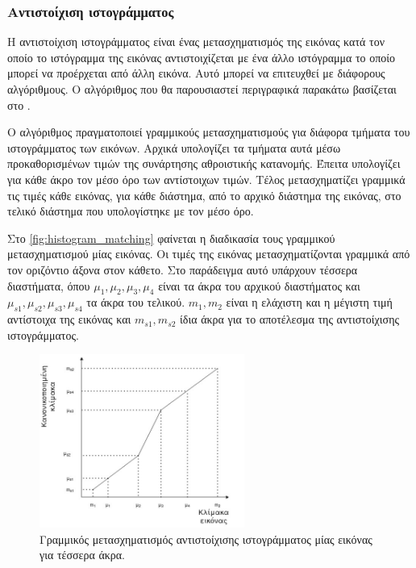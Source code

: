\documentclass[a4paper,12pt]{article}
\begin{document}
\subsubsection{Αντιστοίχιση ιστογράμματος} \label{histogram:1}

Η αντιστοίχιση ιστογράμματος είναι ένας μετασχηματισμός της εικόνας κατά τον
οποίο το ιστόγραμμα της εικόνας αντιστοιχίζεται με ένα άλλο ιστόγραμμα το οποίο
μπορεί να προέρχεται από άλλη εικόνα. Αυτό μπορεί να επιτευχθεί με διάφορους
αλγόριθμους. Ο αλγόριθμος που θα παρουσιαστεί περιγραφικά παρακάτω βασίζεται στο
\cite{histogram_matching:1}.

Ο αλγόριθμος πραγματοποιεί γραμμικούς μετασχηματισμούς για διάφορα τμήματα του
ιστογράμματος των εικόνων. Αρχικά υπολογίζει τα τμήματα αυτά μέσω
προκαθορισμένων τιμών της συνάρτησης αθροιστικής κατανομής. Έπειτα υπολογίζει
για κάθε άκρο τον μέσο όρο των αντίστοιχων τιμών. Τέλος μετασχηματίζει γραμμικά
τις τιμές κάθε εικόνας, για κάθε διάστημα, από το αρχικό διάστημα της εικόνας,
στο τελικό διάστημα που υπολογίστηκε με τον μέσο όρο.

Στο \autoref{fig:histogram_matching} φαίνεται η διαδικασία τους γραμμικού
μετασχηματισμού μίας εικόνας. Οι τιμές της εικόνας μετασχηματίζονται γραμμικά
από τον οριζόντιο άξονα στον κάθετο. Στο παράδειγμα αυτό υπάρχουν τέσσερα
διαστήματα, όπου $\mu_1, \mu_2, \mu_3, \mu_4$ είναι τα άκρα του αρχικού
διαστήματος και $\mu_{s1}, \mu_{s2}, \mu_{s3}, \mu_{s4}$ τα άκρα του τελικού.
$m_1, m_2$ είναι η ελάχιστη και η μέγιστη τιμή αντίστοιχα της εικόνας και
$m_{s1}, m_{s2}$ ίδια άκρα για το αποτέλεσμα της αντιστοίχισης ιστογράμματος.

\begin{figure}[H]
    \centering
    \includegraphics[width=0.6\textwidth]{histogram_matching_2}

    \caption{Γραμμικός μετασχηματισμός αντιστοίχισης ιστογράμματος μίας εικόνας
             για τέσσερα άκρα.}
    \label{fig:histogram_matching}
\end{figure}
\end{document}
